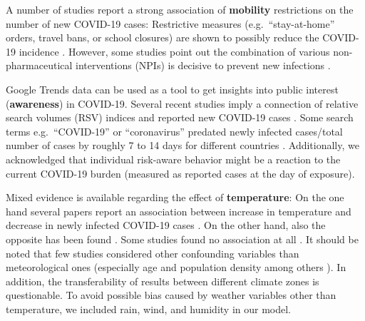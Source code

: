 \documentclass[]{elsarticle} %
\begin{document}
A number of studies report a strong association of \textbf{mobility} restrictions on the number of new COVID-19 cases: Restrictive measures (e.g.~``stay-at-home'' orders, travel bans, or school closures) are shown to possibly reduce the COVID-19 incidence \citep{chang_modeling_2020, Chinazzi395, fowler_effect_2020, kraemer_effect_2020, lasry_timing_2020, linka_outbreak_2020, mazzoli_effects_2020, xiong_data-driven_2020}. However, some studies point out the combination of various non-pharmaceutical interventions (NPIs) is decisive to prevent new infections \citep{juni_impact_2020, lai_effect_2020}.

Google Trends \citep{google_trends} data can be used as a tool to get insights into public interest (\textbf{awareness}) in COVID-19. Several recent studies imply a connection of relative search volumes (RSV) indices and reported new COVID-19 cases \citep{ayyoubzadeh_predicting_2020, effenberger_association_2020, higgins_correlations_2020, li_retrospective_2020, lin_google_2020, mavragani_tracking_2020, walker_use_2020, yuan_trends_2020, zhou_effects_2020}. Some search terms e.g.~``COVID-19'' or ``coronavirus'' predated newly infected cases/total number of cases by roughly 7 to 14 days for different countries \citep{effenberger_association_2020, higgins_correlations_2020, li_retrospective_2020, yuan_trends_2020}. Additionally, we acknowledged that individual risk-aware behavior might be a reaction to the current COVID-19 burden (measured as reported cases at the day of exposure).

Mixed evidence is available regarding the effect of \textbf{temperature}: On the one hand several papers report an association between increase in temperature and decrease in newly infected COVID-19 cases \citep{bannister-tyrrell_preliminary_2020, demongeot_temperature_2020, liu_impact_2020, qi_covid-19_2020, shi_impact_2020, sobral_association_2020, tosepu_correlation_2020, Wang2020temperature, wu_effects_2020}. On the other hand, also the opposite has been found \citep{auler_evidence_2020, xie_association_2020}. Some studies found no association at all \citep{briz-redon_spatio-temporal_2020, iqbal_nexus_2020, jahangiri_sensitivity_2020, juni_impact_2020, yao_no_2020}. It should be noted that few studies considered other confounding variables than meteorological ones (especially age and population density among others \citep{briz-redon_spatio-temporal_2020, juni_impact_2020, wu_effects_2020}). In addition, the transferability of results between different climate zones is questionable. To avoid possible bias caused by weather variables other than temperature, we included rain, wind, and humidity in our model.
\end{document}
